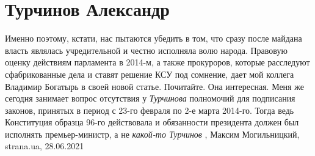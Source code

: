  
 
 
 
 
\section{Турчинов Александр}
\label{sec:people.turchinov_aleksandr_politik_ukr}

Именно поэтому, кстати, нас пытаются убедить в том, что сразу после майдана
власть являлась учредительной и честно исполняла волю народа.
Правовую оценку действиям парламента в 2014-м, а также прокуроров, которые
расследуют сфабрикованные дела и ставят решение КСУ под сомнение, дает мой
коллега Владимир Богатырь в своей новой статье. Почитайте. Она интересная.
Меня же сегодня занимает вопрос отсутствия у \emph{Турчинова} полномочий для
подписания законов, принятых в период с 23-го февраля по 2-е марта 2014-го.
Тогда ведь Конституция образца 96-го действовала и обязанности президента
должен был исполнять премьер-министр, а не \emph{какой-то Турчинов}
, 
Максим Могильницкий, strana.ua, 28.06.2021
